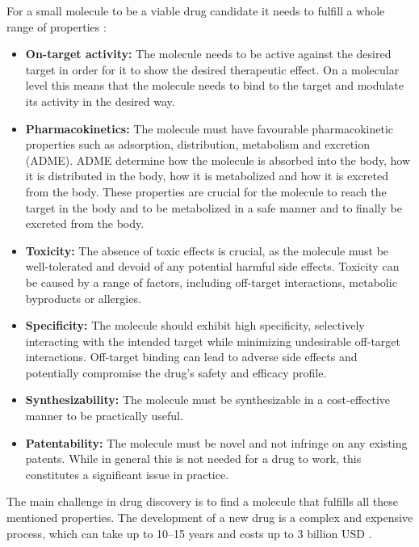 For a small molecule to be a viable drug candidate it needs to fulfill a whole range of properties
\citep{todo}:
\begin{itemize}
      \item \textbf{On-target activity:} The molecule needs to be active against the desired target
            in order for it to show the desired therapeutic effect. On a molecular level this means
            that the molecule needs to bind to the target and modulate its activity in the desired
            way.
      \item \textbf{Pharmacokinetics:} The molecule must have favourable pharmacokinetic properties
            such as adsorption, distribution, metabolism and excretion (ADME). ADME determine how
            the molecule is absorbed into the body, how it is distributed in the body, how it is
            metabolized and how it is excreted from the body. These properties are crucial for the
            molecule to reach the target in the body and to be metabolized in a safe manner and to
            finally be excreted from the body.
      \item \textbf{Toxicity:}  The absence of toxic effects is crucial, as the molecule must be
            well-tolerated and devoid of any potential harmful side effects. Toxicity can be caused
            by a range of factors, including off-target interactions, metabolic byproducts or
            allergies.
      \item \textbf{Specificity:}  The molecule should exhibit high specificity, selectively
            interacting with the intended target while minimizing undesirable off-target
            interactions. Off-target binding can lead to adverse side effects and potentially
            compromise the drug's safety and efficacy profile.
      \item \textbf{Synthesizability:} The molecule must be synthesizable in a cost-effective manner
            to be practically useful.
      \item \textbf{Patentability:} The molecule must be novel and not infringe on any existing
            patents. While in general this is not needed for a drug to work, this constitutes a
            significant issue in practice.
\end{itemize}

The main challenge in drug discovery is to find a molecule that fulfills all these mentioned
properties. The development of a new drug is a complex and expensive process, which can take up to
10--15 years and costs up to 3 billion USD \citep{todo}.


